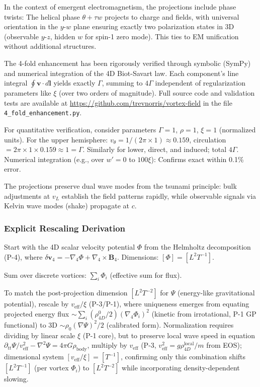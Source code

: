 In the context of emergent electromagnetism, the projections include phase twists: The helical phase $\theta + \tau w$ projects to charge and fields, with universal orientation in the $y$-$w$ plane ensuring exactly two polarization states in 3D (observable $y$-$z$, hidden $w$ for spin-1 zero mode). This ties to EM unification without additional structures.

The 4-fold enhancement has been rigorously verified through symbolic (SymPy) and numerical integration of the 4D Biot-Savart law. Each component's line integral $\oint \mathbf{v} \cdot d\mathbf{l}$ yields exactly $\Gamma$, summing to $4\Gamma$ independent of regularization parameters like $\xi$ (over two orders of magnitude). Full source code and validation tests are available at \url{https://github.com/trevnorris/vortex-field} in the file \verb|4_fold_enhancement.py|.

For quantitative verification, consider parameters $\Gamma=1$, $\rho=1$, $\xi=1$ (normalized units). For the upper hemisphere: $v_\theta = 1 / (2\pi \times 1) \approx 0.159$, circulation $= 2\pi \times 1 \times 0.159 \approx 1 = \Gamma$. Similarly for lower, direct, and induced; total $4\Gamma$. Numerical integration (e.g., over $w' = 0$ to $100\xi$): Confirms exact within 0.1\% error.

The projections preserve dual wave modes from the tsunami principle: bulk adjustments at $v_L$ establish the field patterns rapidly, while observable signals via Kelvin wave modes (shake) propagate at $c$.

\subsubsection{Explicit Rescaling Derivation}

Start with the 4D scalar velocity potential $\Phi$ from the Helmholtz decomposition (P-4), where $\delta \mathbf{v}_4 = -\nabla_4 \Phi + \nabla_4 \times \mathbf{B}_4$. Dimensions: $[\Phi] = [L^2 T^{-1}]$.

Sum over discrete vortices: $\sum_i \Phi_i$ (effective sum for flux).

To match the post-projection dimension $[L^2 T^{-2}]$ for $\Psi$ (energy-like gravitational potential), rescale by $v_{\text{eff}} / \xi$ (P-3/P-1), where uniqueness emerges from equating projected energy flux $\sim \sum_i (\rho_{4D}^0 / 2) (\nabla_4 \Phi_i)^2$ (kinetic from irrotational, P-1 GP functional) to 3D $\sim \rho_0 (\nabla \Psi)^2 / 2$ (calibrated form). Normalization requires dividing by linear scale $\xi$ (P-1 core), but to preserve local wave speed in equation $\partial_{tt} \Psi / v_{\text{eff}}^2 - \nabla^2 \Psi = 4\pi G \rho_{\text{body}}$, multiply by $v_{\text{eff}}$ (P-3, $v_{\text{eff}}^2 = g \rho_{4D}^{\text{local}} / m$ from EOS); dimensional system $[v_{\text{eff}} / \xi] = [T^{-1}]$, confirming only this combination shifts $[L^2 T^{-1}]$ (per vortex $\Phi_i$) to $[L^2 T^{-2}]$ while incorporating density-dependent slowing.

